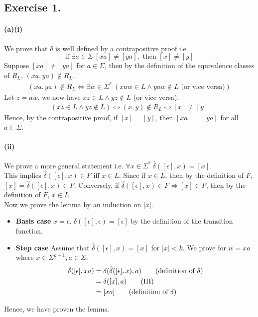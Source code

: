 \documentclass[12pt]{article}
\begin{document}
\subsection*{Exercise 1.}
\paragraph*{(a)(i)} We prove that \(\delta\) is well defined by a contrapositive proof i.e. 
\begin{equation*}
  \text{if } \exists a \in \Sigma \ [xa] \neq [ya], \text{ then } [x] \neq [y]
\end{equation*}
Suppose \([xa] \neq [ya]\) for \(a \in \Sigma\), then by the definition of the equivalence classes of \(R_{L}\), \((xa, ya) \notin R_{L}\).
\begin{align*}
  (xa, ya) \notin R_{L} \Leftrightarrow \exists w \in \Sigma^{*}\ (xaw \in L \land yaw \notin L \text{ (or vice versa)})
\end{align*}
Let \(z = aw\), we now have \(xz \in L \land yz \notin L\) (or vice versa).
\begin{align*}
  (xz \in L \land yz \notin L) \Leftrightarrow (x, y) \notin R_{L} \Leftrightarrow [x] \neq [y]
\end{align*}
Hence, by the contrapositive proof, if \([x] = [y]\), then \([xa] = [ya]\) for all \(a \in \Sigma\).
\paragraph*{(ii)} We prove a more general statement i.e. \(\forall x \in \Sigma^{*}\ \hat{\delta}([\epsilon], x) = [x]\).\\
This implies \(\hat{\delta}([\epsilon], x) \in F\) iff \(x \in L\). Since if \(x \in L\), then by the definition of \(F\), \([x] = \hat{\delta}([\epsilon], x) \in F\). Conversely, if \(\hat{\delta}([\epsilon], x) \in F \Leftrightarrow [x] \in F\), then by the definition of \(F\), \(x \in L\). \\
Now we prove the lemma by an induction on \(|x|\).
\begin{itemize}
  \item \textbf{Basis case} \(x = \epsilon\). \(\delta([\epsilon], \epsilon) = [\epsilon]\) by the definition of the transition function.
  \item \textbf{Step case} Assume that \(\hat{\delta}([\epsilon], x) = [x]\) for \(|x| < k\). We prove for \(w = xa\) where \(x \in \Sigma^{k-1}, a \in \Sigma\).
  \begin{align*}
    \hat{\delta}([\epsilon], xa) &= \delta(\hat{\delta}([\epsilon], x), a) \tag*{(definition of \(\hat{\delta}\))} \\
    &= \delta([x], a) \tag*{(IH)} \\
    &= [xa] \tag*{(definition of \(\delta\))}
  \end{align*}
\end{itemize}
Hence, we have proven the lemma.
\end{document}

